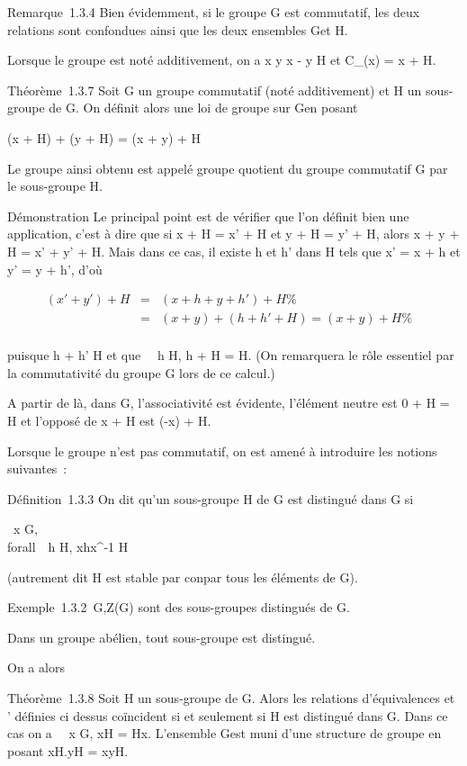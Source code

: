 \documentclass[]{article}
\begin{document}
Remarque~1.3.4 Bien évidemment, si le groupe G est commutatif, les deux
relations sont confondues ainsi que les deux ensembles G\diagupH et H\diagdownG.

Lorsque le groupe est noté additivement, on a x  y
\Leftrightarrow x - y \in H et C\_(x) = x + H.

Théorème~1.3.7 Soit G un groupe commutatif (noté additivement) et H un
sous-groupe de G. On définit alors une loi de groupe sur G\diagupH en posant

(x + H) + (y + H) = (x + y) + H

Le groupe ainsi obtenu est appelé groupe quotient du groupe commutatif G
par le sous-groupe H.

Démonstration Le principal point est de vérifier que l'on définit bien
une application, c'est à dire que si x + H = x' + H et y + H = y' + H,
alors x + y + H = x' + y' + H. Mais dans ce cas, il existe h et h' dans
H tels que x' = x + h et y' = y + h', d'où

\begin{align*} (x' + y') + H& =& (x + h + y + h')
+ H \%& \\ & =& (x + y) + (h + h' + H)
= (x + y) + H\%& \\
\end{align*}

puisque h + h' \in H et que \forall~~h \in H, h + H = H.
(On remarquera le rôle essentiel  par la commutativité du groupe G
lors de ce calcul.)

A partir de là, dans G\diagupH, l'associativité est évidente, l'élément neutre
est 0 + H = H et l'opposé de x + H est (-x) + H.

Lorsque le groupe n'est pas commutatif, on est amené à introduire les
notions suivantes~:

Définition~1.3.3 On dit qu'un sous-groupe H de G est distingué dans G si

\forall~x \in G,\\forall~~h \in H,
xhx^-1 \in H

(autrement dit H est stable par con\jmathugaison par tous les éléments de G).

Exemple~1.3.2 \e\,G,Z(G) sont des
sous-groupes distingués de G.

Dans un groupe abélien, tout sous-groupe est distingué.

On a alors

Théorème~1.3.8 Soit H un sous-groupe de G. Alors les relations
d'équivalences  et ' définies ci dessus coïncident si et seulement si
H est distingué dans G. Dans ce cas on a \forall~~x \in
G, xH = Hx. L'ensemble G\diagupH est muni d'une structure de groupe en posant
xH.yH = xyH.
\end{document}
